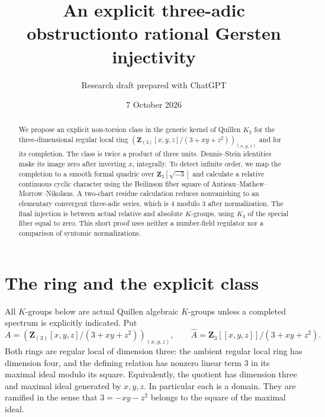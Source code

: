 \documentclass[11pt,a4paper]{article}
\title{\textbf{An explicit three-adic obstruction\newline to rational Gersten injectivity}}
\author{Research draft prepared with ChatGPT}
\date{7 October 2026}
\theoremstyle{remark}
\newcommand{\Z}{\mathbf Z}
\begin{document}
\maketitle
\thispagestyle{empty}
\begin{center}
\end{center}
\begin{abstract}
We propose an explicit non-torsion class in the generic kernel of
Quillen $K_3$ for the three-dimensional regular local ring
$(\Z_{(3)}[x,y,z]/(3+xy+z^2))_{(x,y,z)}$ and for its completion.
The class is twice a product of three units. Dennis--Stein identities
make its image zero after inverting $x$, integrally. To detect infinite
order, we map the completion to a smooth formal quadric over
$\Z_3[\sqrt{-3}]$ and calculate a relative continuous cyclic character
using the Beilinson fiber square of Antieau--Mathew--Morrow--Nikolaus.
A two-chart residue calculation reduces nonvanishing to an elementary
convergent three-adic series, which is $4$ modulo $3$ after normalization.
The final injection is between actual relative and absolute $K$-groups,
using $K_4$ of the special fiber equal to zero. This short proof uses
neither a number-field regulator nor a comparison of syntomic
normalizations.
\end{abstract}

\section{The ring and the explicit class}
All $K$-groups below are actual Quillen algebraic $K$-groups unless a
completed spectrum is explicitly indicated. Put
\[
 A=\left(\Z_{(3)}[x,y,z]/(3+xy+z^2)\right)_{(x,y,z)},
 \qquad
 \widehat A=\Z_3[[x,y,z]]/(3+xy+z^2).
\]
Both rings are regular local of dimension three: the ambient regular
local ring has dimension four, and the defining relation has nonzero
linear term $3$ in its maximal ideal modulo its square. Equivalently,
the quotient has dimension three and maximal ideal generated by
$x,y,z$. In particular each is a domain. They are ramified in the
sense that $3=-xy-z^2$ belongs to the square of the maximal ideal.
\end{document}
